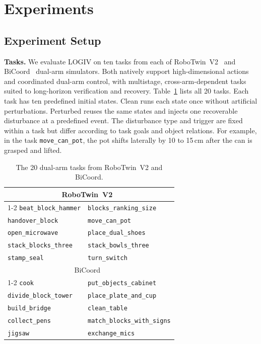 \documentclass[letterpaper,10pt,conference]{ieeeconf}
\newcommand{\method}{LOGIV\xspace}
\begin{document}
\section{Experiments}
\subsection{Experiment Setup}
\textbf{Tasks.}
We evaluate \method on ten tasks from each of RoboTwin~V2~\cite{chen2025robotwin} and BiCoord~\cite{peng2026BiCoord} dual-arm simulators. Both natively support high-dimensional actions and coordinated dual-arm control, with multistage, cross-arm-dependent tasks suited to long-horizon verification and recovery. Table~\ref{tab:tasks} lists all 20 tasks. Each task has ten predefined initial states. Clean runs each state once without artificial perturbations. Perturbed reuses the same states and injects one recoverable disturbance at a predefined event. The disturbance type and trigger are fixed within a task but differ according to task goals and object relations. For example, in the task \texttt{move\_can\_pot}, the pot shifts laterally by 10 to 15\,cm after the can is grasped and lifted. 
\begin{table}[!t]
\centering
\caption{The 20 dual-arm tasks from RoboTwin~V2 and BiCoord.}
\label{tab:tasks}
\small
\renewcommand{\arraystretch}{1.05}
\setlength{\tabcolsep}{2pt}
\begin{tabular*}{\columnwidth}{@{\extracolsep{\fill}}ll@{}}
\toprule
\multicolumn{2}{c}{RoboTwin~V2~\cite{chen2025robotwin}} \\
\cmidrule(lr){1-2}
\texttt{beat\_block\_hammer} & \texttt{blocks\_ranking\_size} \\
\texttt{handover\_block} & \texttt{move\_can\_pot} \\
\texttt{open\_microwave} & \texttt{place\_dual\_shoes} \\
\texttt{stack\_blocks\_three} & \texttt{stack\_bowls\_three} \\
\texttt{stamp\_seal} & \texttt{turn\_switch} \\
\midrule
\multicolumn{2}{c}{BiCoord~\cite{peng2026BiCoord}} \\
\cmidrule(lr){1-2}
\texttt{cook} & \texttt{put\_objects\_cabinet} \\
\texttt{divide\_block\_tower} & \texttt{place\_plate\_and\_cup} \\
\texttt{build\_bridge} & \texttt{clean\_table} \\
\texttt{collect\_pens} & \texttt{match\_blocks\_with\_signs} \\
\texttt{jigsaw} & \texttt{exchange\_mics} \\
\bottomrule
\end{tabular*}
\end{table}
\end{document}
